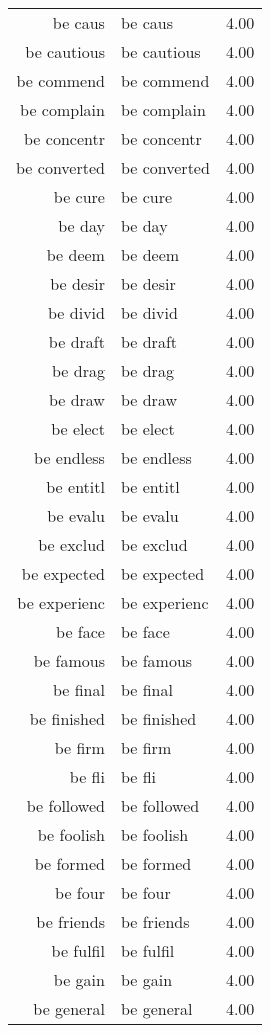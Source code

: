 \begin{table}[ht]
\begin{tabular}{rlr}
  be caus & be caus & 4.00 \\ 
  be cautious & be cautious & 4.00 \\ 
  be commend & be commend & 4.00 \\ 
  be complain & be complain & 4.00 \\ 
  be concentr & be concentr & 4.00 \\ 
  be converted & be converted & 4.00 \\ 
  be cure & be cure & 4.00 \\ 
  be day & be day & 4.00 \\ 
  be deem & be deem & 4.00 \\ 
  be desir & be desir & 4.00 \\ 
  be divid & be divid & 4.00 \\ 
  be draft & be draft & 4.00 \\ 
  be drag & be drag & 4.00 \\ 
  be draw & be draw & 4.00 \\ 
  be elect & be elect & 4.00 \\ 
  be endless & be endless & 4.00 \\ 
  be entitl & be entitl & 4.00 \\ 
  be evalu & be evalu & 4.00 \\ 
  be exclud & be exclud & 4.00 \\ 
  be expected & be expected & 4.00 \\ 
  be experienc & be experienc & 4.00 \\ 
  be face & be face & 4.00 \\ 
  be famous & be famous & 4.00 \\ 
  be final & be final & 4.00 \\ 
  be finished & be finished & 4.00 \\ 
  be firm & be firm & 4.00 \\ 
  be fli & be fli & 4.00 \\ 
  be followed & be followed & 4.00 \\ 
  be foolish & be foolish & 4.00 \\ 
  be formed & be formed & 4.00 \\ 
  be four & be four & 4.00 \\ 
  be friends & be friends & 4.00 \\ 
  be fulfil & be fulfil & 4.00 \\ 
  be gain & be gain & 4.00 \\ 
  be general & be general & 4.00 \\ 

\end{tabular}
\end{table}
